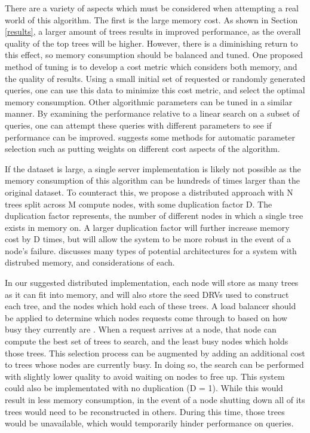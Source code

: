 There are a variety of aspects which must be considered when attempting a real world of this algorithm.  The first is the large memory cost.  As shown in Section \ref{results}, a larger amount of trees results in improved performance, as the overall quality of the top trees will be higher.  However, there is a diminishing return to this effect, so memory consumption should be balanced and tuned.  One proposed method of tuning is to develop a cost metric which considers both memory, and the quality of results.  Using a small initial set of requested or randomly generated queries, one can use this data to minimize this cost metric, and select the optimal memory consumption.  Other algorithmic parameters can be tuned in a similar manner.  By examining the performance relative to a linear search on a subset of queries, one can attempt these queries with different parameters to see if performance can be improved.  \citep{muja_flann_2009} suggests some methods for automatic parameter selection such as putting weights on different cost aspects of the algorithm.

If the dataset is large, a single server implementation is likely not possible as the memory consumption of this algorithm can be hundreds of times larger than the original dataset.  To counteract this, we propose a distributed approach with N trees split across M compute nodes, with some duplication factor D.  The duplication factor represents, the number of different nodes in which a single tree exists in memory on.  A larger duplication factor will further increase memory cost by D times, but will allow the system to be more robust in the event of a node's failure.  \citep{nitzberg1991distributed} discusses many types of potential architectures for a system with distrubed memory, and considerations of each.

In our suggested distributed implementation, each node will store as many trees as it can fit into memory, and will also store the seed DRVs used to construct each tree, and the nodes which hold each of these trees.  A load balancer should be applied to determine which nodes requests come through to based on how busy they currently are \citep{cybenko1989dynamic}.  When a request arrives at a node, that node can compute the best set of trees to search, and the least busy nodes which holds those trees.  This selection process can be augmented by adding an additional cost to trees whose nodes are currently busy.  In doing so, the search can be performed with slightly lower quality to avoid waiting on nodes to free up.  This system could also be implementated with no duplication (D = 1).  While this would result in less memory consumption, in the event of a node shutting down all of its trees would need to be reconstructed in others.  During this time, those trees would be unavailable, which would temporarily hinder performance on queries.

